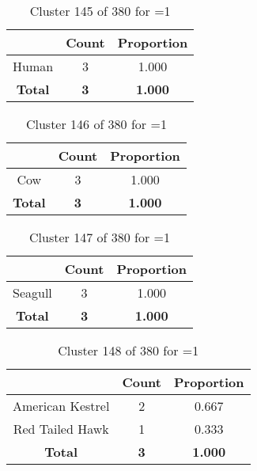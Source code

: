 \begin{table}[ht!]
\centering
\begin{tabular}{|c|c|c|}
\hline
\bf \Spec{} &\bf Count &\bf Proportion\\ \hline \hline
Human & 3 & 1.000\\ \hline
\hline
\bf Total & \bf 3 & \bf 1.000\\ \hline
\end{tabular}
\label{tab:cluster:145:1}
\caption{Cluster 145 of 380 for \minneigh{}=1}
\end{table}

\begin{table}[ht!]
\centering
\begin{tabular}{|c|c|c|}
\hline
\bf \Spec{} &\bf Count &\bf Proportion\\ \hline \hline
Cow & 3 & 1.000\\ \hline
\hline
\bf Total & \bf 3 & \bf 1.000\\ \hline
\end{tabular}
\label{tab:cluster:146:1}
\caption{Cluster 146 of 380 for \minneigh{}=1}
\end{table}

\begin{table}[ht!]
\centering
\begin{tabular}{|c|c|c|}
\hline
\bf \Spec{} &\bf Count &\bf Proportion\\ \hline \hline
Seagull & 3 & 1.000\\ \hline
\hline
\bf Total & \bf 3 & \bf 1.000\\ \hline
\end{tabular}
\label{tab:cluster:147:1}
\caption{Cluster 147 of 380 for \minneigh{}=1}
\end{table}

\begin{table}[ht!]
\centering
\begin{tabular}{|c|c|c|}
\hline
\bf \Spec{} &\bf Count &\bf Proportion\\ \hline \hline
American Kestrel & 2 & 0.667\\ \hline
Red Tailed Hawk & 1 & 0.333\\ \hline
\hline
\bf Total & \bf 3 & \bf 1.000\\ \hline
\end{tabular}
\label{tab:cluster:148:1}
\caption{Cluster 148 of 380 for \minneigh{}=1}
\end{table}

